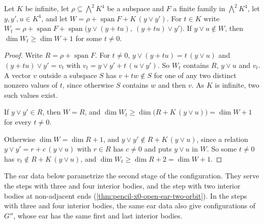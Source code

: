 \begin{lemma}
  \label{lem:pencil-insertion}
  \leanok
  Let $K$ be infinite, let $\rho \subseteq \bigwedge^2 K^4$ be a subspace
  and $F$ a finite family in $\bigwedge^2 K^4$, let $y, y', u \in K^4$, and
  let $W = \rho + \operatorname{span} F + K\,(y \vee y')$. For $t \in K$
  write $W_t = \rho + \operatorname{span} F +
  \operatorname{span}\bigl(y \vee (y + t u),\ (y + t u) \vee y'\bigr)$.
  If $y \vee u \notin W$, then $\dim W_t \ge \dim W + 1$ for some
  $t \neq 0$.
\end{lemma}
\begin{proof}
  \leanok
  Write $R = \rho + \operatorname{span} F$. For $t \neq 0$,
  $y \vee (y + t u) = t\,(y \vee u)$ and
  $(y + t u) \vee y' = v_t$ with $v_t = y \vee y' + t\,(u \vee y')$.
  So $W_t$ contains $R$, $y \vee u$ and $v_t$. A vector $v$ outside a
  subspace $S$ has $v + t w \notin S$ for one of any two distinct nonzero
  values of $t$, since otherwise $S$ contains $w$ and then $v$. As $K$ is
  infinite, two such values exist.

  If $y \vee y' \in R$, then $W = R$, and
  $\dim W_t \ge \dim\bigl(R + K\,(y \vee u)\bigr)
  = \dim W + 1$ for every $t \neq 0$.

  Otherwise $\dim W = \dim R + 1$, and
  $y \vee y' \notin R + K\,(y \vee u)$, since a relation
  $y \vee y' = r + c\,(y \vee u)$ with $r \in R$ has $c \neq 0$ and
  puts $y \vee u$ in $W$. So some $t \neq 0$ has
  $v_t \notin R + K\,(y \vee u)$, and $\dim W_t \ge \dim R + 2 =
  \dim W + 1$.
\end{proof}

The ear data below parametrize the second stage of the configuration.
They serve the steps with three and four interior bodies, and the step
with two interior bodies at non-adjacent ends
(\cref{thm:pencil-x0-open-ear-two-orbit}). In the steps with three and
four interior bodies, the same ear data also give configurations of
$G''$, whose ear has the same first and last interior bodies.

